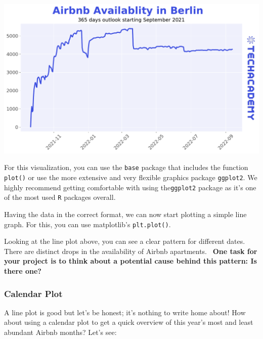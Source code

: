 \documentclass[
  11pt,
]{article}
\newenvironment{tips}[1]
  {
  \begin{itemize}
  \footnotesize
  \renewcommand{\labelitemi}{
    \raisebox{-.7\height}[0pt][0pt]{
      {\setkeys{Gin}{width=3em,keepaspectratio}
        \texttt{[image: images/\#1.png]}}
    }
  }
  \setlength{\fboxsep}{1em}
  \begin{rbox}
  \item
  }
  {
  \end{rbox}
  \end{itemize}
  }
\newenvironment{tipsp}[1]
  {
  \begin{itemize}
  \footnotesize
  \renewcommand{\labelitemi}{
    \raisebox{-.7\height}[0pt][0pt]{
      {\setkeys{Gin}{width=3em,keepaspectratio}
        \texttt{[image: images/\#1.png]}}
    }
  }
  \setlength{\fboxsep}{1em}
  \begin{pbox}
  \item
  }
  {
  \end{pbox}
  \end{itemize}
  }
\begin{document}
\begin{center}\includegraphics[width=1\linewidth]{plot/01_python/availability} \end{center}

\begin{tips}r
For this visualization, you can use the \texttt{base} package that includes the function \texttt{plot()} or use the more extensive and very flexible graphics package \texttt{ggplot2}.
We highly recommend getting comfortable with using the\texttt{ggplot2} package as it's one of the most used \texttt{R} packages overall.

\end{tips}

\begin{tipsp}p
Having the data in the correct format, we can now start plotting a simple line graph.
For this, you can use matplotlib's \texttt{plt.plot()}.

\end{tipsp}

Looking at the line plot above, you can see a clear pattern for different dates.
There are distinct drops in the availability of Airbnb apartments.~
\textbf{One task for your project is to think about a potential cause behind this pattern: Is there one?}

\hypertarget{calendar-plot}{%
\subsubsection{Calendar Plot}\label{calendar-plot}}

A line plot is good but let's be honest; it's nothing to write home about!
How about using a calendar plot to get a quick overview of this year's most and least abundant Airbnb months?
Let's see:
\end{document}
